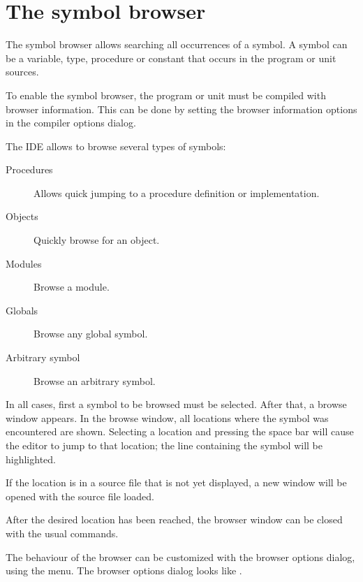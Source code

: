 \section{The symbol browser}
\label{se:browser}
The symbol browser allows searching all occurrences of a symbol. A symbol
can be a variable, type, procedure or constant that occurs in the
program or unit sources.

To enable the symbol browser, the program or unit must be compiled with
browser information. This can be done by setting the browser information
options in the compiler options dialog.

The IDE allows to browse several types of symbols:
\begin{description}
\item[Procedures] Allows quick jumping to a procedure definition or
implementation.
\item[Objects] Quickly browse for an object.
\item[Modules] Browse a module.
\item[Globals] Browse any global symbol.
\item[Arbitrary symbol] Browse an arbitrary symbol.
\end{description}
In all cases, first a symbol to be browsed must be selected. After that,
a browse window appears. In the browse window, all locations where the
symbol was encountered are shown. Selecting a location and pressing the
space bar will cause the editor to jump to that location; the line
containing the symbol will be highlighted.

If the location is in a source file that is not yet displayed, a new
window will be opened with the source file loaded.

After the desired location has been reached, the browser window can be closed
with the usual commands.

The behaviour of the browser can be customized with the browser options
dialog, using the  menu.
The browser options dialog looks like .


